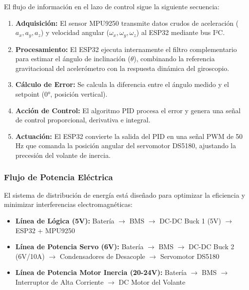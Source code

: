 \documentclass[12pt,letterpaper]{report}
\begin{document}
El flujo de información en el lazo de control sigue la siguiente secuencia:

\begin{enumerate}
    \setlength\itemsep{4pt}
    \item \textbf{Adquisición:} El sensor MPU9250 transmite datos crudos de aceleración ($a_x, a_y, a_z$) y velocidad angular ($\omega_x, \omega_y, \omega_z$) al ESP32 mediante bus I²C.
    
    \item \textbf{Procesamiento:} El ESP32 ejecuta internamente el filtro complementario para estimar el ángulo de inclinación ($\theta$), combinando la referencia gravitacional del acelerómetro con la respuesta dinámica del giroscopio.
    
    \item \textbf{Cálculo de Error:} Se calcula la diferencia entre el ángulo medido y el setpoint (0°, posición vertical).
    
    \item \textbf{Acción de Control:} El algoritmo PID procesa el error y genera una señal de control proporcional, derivativa e integral.
    
    \item \textbf{Actuación:} El ESP32 convierte la salida del PID en una señal PWM de 50 Hz que comanda la posición angular del servomotor DS5180, ajustando la precesión del volante de inercia.
\end{enumerate}

\subsubsection*{Flujo de Potencia Eléctrica}

El sistema de distribución de energía está diseñado para optimizar la eficiencia y minimizar interferencias electromagnéticas:

\begin{itemize}
    \setlength\itemsep{4pt}
    \item \textbf{Línea de Lógica (5V):} Batería $\rightarrow$ BMS $\rightarrow$ DC-DC Buck 1 (5V) $\rightarrow$ ESP32 + MPU9250
    
    \item \textbf{Línea de Potencia Servo (6V):} Batería $\rightarrow$ BMS $\rightarrow$ DC-DC Buck 2 (6V/10A) $\rightarrow$ Condensadores de Desacople $\rightarrow$ Servomotor DS5180
    
    \item \textbf{Línea de Potencia Motor Inercia (20-24V):} Batería $\rightarrow$ BMS $\rightarrow$ Interruptor de Alta Corriente $\rightarrow$ DC Motor del Volante
\end{itemize}
\end{document}
